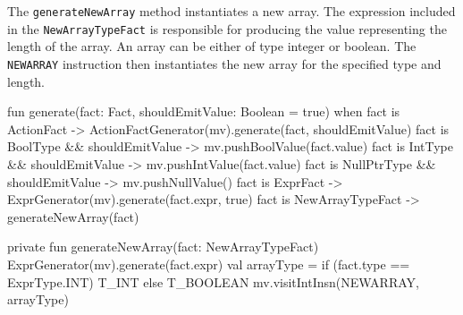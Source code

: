The \verb|generateNewArray| method instantiates a new array. The expression included in the \verb|NewArrayTypeFact| is responsible for producing the value representing the length of the array. An array can be either of type integer or boolean. The \verb|NEWARRAY| instruction then instantiates the new array for the specified type and length.  



\begin{KotlinCode}[float,numbers=none,caption=Implementation of the \texttt{generate} method of the \texttt{FactGenerator}., label=lst:BtGenExprFactGen]
fun generate(fact: Fact, shouldEmitValue: Boolean = true) {
    when {
        fact is ActionFact -> ActionFactGenerator(mv).generate(fact, shouldEmitValue)
        fact is BoolType && shouldEmitValue -> mv.pushBoolValue(fact.value)
        fact is IntType && shouldEmitValue -> mv.pushIntValue(fact.value)
        fact is NullPtrType && shouldEmitValue -> mv.pushNullValue()
        fact is ExprFact -> ExprGenerator(mv).generate(fact.expr, true)
        fact is NewArrayTypeFact -> generateNewArray(fact)
    }
}

private fun generateNewArray(fact: NewArrayTypeFact) {
    ExprGenerator(mv).generate(fact.expr)
    val arrayType = if (fact.type == ExprType.INT) {
        T_INT
    } else {
        T_BOOLEAN
    }
    mv.visitIntInsn(NEWARRAY, arrayType)
}
\end{KotlinCode}


